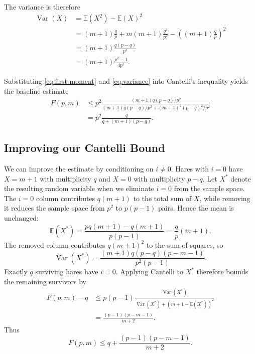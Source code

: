 \documentclass{article}
\begin{document}
The variance is therefore
\begin{align}
\operatorname{Var}(X)
  &= \mathbb{E}(X^2)-\mathbb{E}(X)^2 \\
  &= (m+1)\frac{q}{p}
     +m(m+1)\frac{q^2}{p^2}
     -\left((m+1)\frac{q}{p}\right)^2 \\
  &= (m+1)\frac{q(p-q)}{p^2} \\
  &= (m+1)\frac{p^2-1}{4p^2}.
\label{eq:variance}
\end{align}

Substituting \eqref{eq:first-moment} and
\eqref{eq:variance} into Cantelli's inequality yields the baseline estimate
\begin{align}
F(p,m)
&\leq p^2
\frac{(m+1)q(p-q)/p^2}
     {(m+1)q(p-q)/p^2+(m+1)^2(p-q)^2/p^2} \\
&=p^2\frac{q}{q+(m+1)(p-q)}.
\label{eq:baseline-cantelli}
\end{align}

\subsection{Improving our Cantelli Bound}

We can improve the estimate by conditioning on $i\neq0$. Hares with $i=0$
have $X=m+1$ with multiplicity $q$ and $X=0$ with multiplicity $p-q$.
Let $X^*$ denote
the resulting random variable when we eliminate $i=0$ from the sample space. The $i=0$ column contributes $q(m+1)$ to the
total sum of $X$, while removing it reduces the sample space from $p^2$ to
$p(p-1)$ pairs. Hence the mean is unchanged:
\begin{equation}
\mathbb{E}(X^*)
=\frac{pq(m+1)-q(m+1)}{p(p-1)}
=\frac{q}{p}(m+1).
\end{equation}
The removed column contributes $q(m+1)^2$ to the sum of squares, so
\begin{equation}
\operatorname{Var}(X^*)
=\frac{(m+1)q(p-q)(p-m-1)}{p^2(p-1)}.
\end{equation}
Exactly $q$ surviving hares have $i=0$. Applying Cantelli to $X^*$ therefore
bounds the remaining survivors by
\begin{align}
F(p,m)-q
&\leq p(p-1)
\frac{\operatorname{Var}(X^*)}
     {\operatorname{Var}(X^*)+(m+1-\mathbb{E}(X^*))^2} \\
&=\frac{(p-1)(p-m-1)}{m+2}.
\end{align}
Thus
\begin{equation}
    \boxed{
F(p,m)\leq q+\frac{(p-1)(p-m-1)}{m+2}.}
\label{eq:improved-cantelli}
\end{equation}
\end{document}
